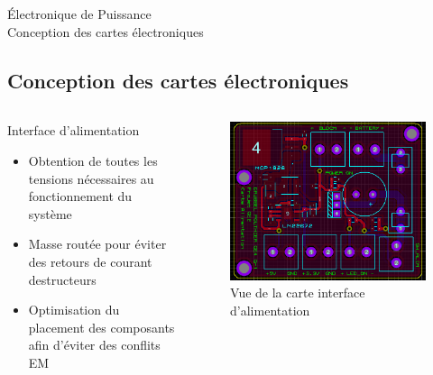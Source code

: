 \documentclass{beamer}
\begin{document}
	\begin{frame}{Électronique de Puissance\\ Conception des cartes électroniques}
		\subsection[PCBs]{Conception des cartes électroniques}
		\begin{columns}[T]
	  		\begin{column}{0.5\textwidth}
	  			Interface d'alimentation
		    	\begin{itemize}
		    		\item Obtention de toutes les tensions nécessaires au fonctionnement du système
		    		\item Masse routée pour éviter des retours de courant destructeurs
		    		\item Optimisation du placement des composants afin d'éviter des conflits EM
		    	\end{itemize}
	  		\end{column}
	  		\begin{column}{0.5\textwidth}
	  			\begin{figure}
	  				\begin{center}
	  					\includegraphics[height=0.5\textheight]{../Illus/PCB_Alim.PNG}
	  				\end{center}
	    			\caption{Vue de la carte interface d'alimentation}
	    		\end{figure}
	  		\end{column}
		\end{columns}
	\end{frame}
\end{document}
